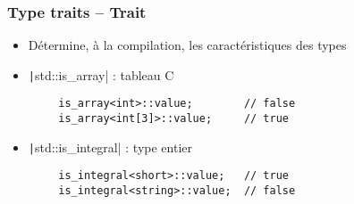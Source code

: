 \documentclass[C++.tex]{subfiles}
\begin{document}
\begin{frame}[fragile]
	\frametitle{Type traits -- Trait}
	\begin{itemize}
		\item Détermine, à la compilation, les caractéristiques des types
		\item \texttt|std::is_array| : tableau C
	\end{itemize}

	\begin{verbatim}
		is_array<int>::value;        // false
		is_array<int[3]>::value;     // true
	\end{verbatim}

	\begin{itemize}
		\item \texttt|std::is_integral| : type entier
	\end{itemize}

	\begin{verbatim}
		is_integral<short>::value;   // true
		is_integral<string>::value;  // false
	\end{verbatim}

\end{frame}
\end{document}
